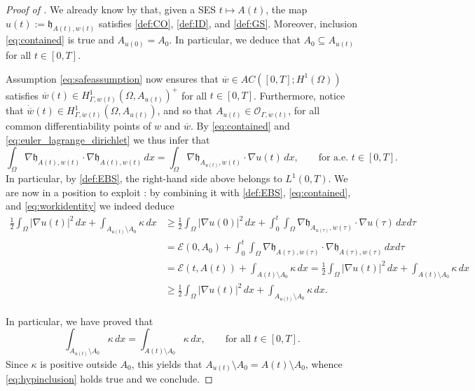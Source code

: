 \documentclass[a4paper,11pt,reqno]{amsart}
\numberwithin{equation}{section}
\theoremstyle{definition}
\theoremstyle{remark}
\begin{document}
    \begin{proof}[Proof of ]
     We already know by  that, given a SES $t\mapsto A(t)$, the map $u(t):=\mathfrak{h}_{A(t),w(t)}$ satisfies \ref{def:CO}, \ref{def:ID}, and \ref{def:GS}. 
     Moreover, inclusion \eqref{eq:contained} is true and $A_{u(0)}=A_0$. In particular, we deduce that $A_0\subseteq A_{u(t)}$ for all $t\in [0,T]$.

     Assumption \eqref{eq:safeassumption} now ensures that $\overline w\in AC([0,T];H^1(\Omega))$ satisfies $\overline w(t)\in H^1_{\Gamma,w(t)}(\Omega,A_{u(t)})^+$ for all $t\in [0,T]$. Furthermore, notice that $\dot{\overline w}(t)\in H^1_{\Gamma,\dot w(t)}(\Omega, A_{u(t)})$, and so that $A_{u(t)}\in \mathcal O_{\Gamma,\dot w(t)}$, for all common differentiability points of $w$ and $\overline w$. By \eqref{eq:contained} and \eqref{eq:euler_lagrange_dirichlet} we thus infer that
    \begin{equation}\label{eq:workidentity}
         \int_\Omega \nabla {\mathfrak{h}_{A(t),\dot w(t)}}\cdot \nabla \mathfrak{h}_{A(t),w(t)} \, dx=\int_\Omega \nabla \mathfrak{h}_{A_{u(t)},\dot w(t)}\cdot \nabla u(t) \, dx,\qquad \text{for a.e. }t\in [0,T].
    \end{equation}
    In particular, by \ref{def:EBS}, the right-hand side above belongs to $L^1(0,T)$. We are now in a position to exploit : by combining it with \ref{def:EBS}, \eqref{eq:contained}, and \eqref{eq:workidentity} we indeed deduce
    \begin{align}
        \frac 12 \int_\Omega|\nabla u(t)|^2 \, dx+\int_{A_{u(t)}\setminus A_0}\kappa\,d x&\ge  \frac 12 \int_\Omega|\nabla u(0)|^2 \, dx+\int_0^t\int_\Omega \nabla \mathfrak{h}_{A_{u(\tau)},\dot w(\tau)}\cdot \nabla u(\tau) \, dxd\tau\\
        &=\mathcal E(0,A_0)+\int_0^t \int_\Omega \nabla {\mathfrak{h}_{A(\tau),\dot w(\tau)}}\cdot \nabla \mathfrak{h}_{A(\tau),w(\tau)} \, dxd\tau\\
        &= \mathcal E(t,A(t))+\int_{A(t)\setminus A_0}\kappa\,d x=\frac 12 \int_\Omega|\nabla u(t)|^2 \, dx+ \int_{A(t)\setminus A_0}\kappa\,d x\\
        &\ge \frac 12 \int_\Omega|\nabla u(t)|^2 \, dx+ \int_{A_{u(t)}\setminus A_0}\kappa\,d x.
    \end{align}
    
    In particular, we have proved that
    \begin{equation}
        \int_{A_{u(t)}\setminus A_0}\kappa\,d x=\int_{A(t)\setminus A_0}\kappa\,d x,\qquad\text{for all }t\in [0,T].
    \end{equation}
    Since $\kappa$ is positive outside $A_0$, this yields that $A_{u(t)}\setminus A_0=A(t)\setminus A_0$, whence \eqref{eq:hypinclusion} holds true and we conclude.
    \end{proof}
\end{document}

